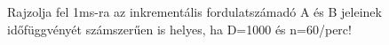 \begin{example}

Rajzolja fel 1ms-ra az inkrementális fordulatszámadó A és B jeleinek időfüggvényét számszerűen is helyes, ha D=1000 és n=60/perc!

\tcbline
\vspace{1mm}

\solution

\end{example}